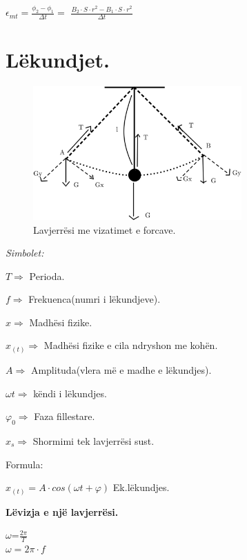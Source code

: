 \documentclass[twocolumn]{article}
\begin{document}
	$\epsilon_{mt} = \frac{\phi_2 - \phi_1}{\Delta t}$$=$ $\frac{B_2 \cdot S \cdot r^2-B_1 \cdot S \cdot r^2}{\Delta t}$
	
	\section{Lëkundjet.}
	
	\begin{figure}[h]
		\includegraphics[width=80mm]{Imazhet/lekundjet.png}
		\caption{Lavjerrësi me vizatimet e forcave.}
		\label{fig:boat1}
	\end{figure}
	\begin{center}
		\textit{Simbolet:}
	\end{center}
	
	$T \Rightarrow$ Perioda.
	
	$f \Rightarrow $ Frekuenca(numri i lëkundjeve).
	
	$x \Rightarrow$ Madhësi fizike.
	
	$x_{(t)} \Rightarrow$ Madhësi fizike e cila ndryshon me kohën.
	
	$A \Rightarrow$ Amplituda(vlera më e madhe e lëkundjes).
	
	$\omega t \Rightarrow$ këndi i lëkundjes.
	
	$\varphi_0 \Rightarrow$ Faza fillestare.
	
	$x_s \Rightarrow $ Shormimi tek lavjerrësi sust.
	\begin{center}
		Formula:
	\end{center}
	
	$x_{(t)}=A \cdot cos(\omega t + \varphi) $ Ek.lëkundjes.
	
	\begin{center}
		\textbf{Lëvizja e një lavjerrësi.}
		
		$\omega$=$\frac{2 \pi}{T}$\\
		
		$\omega=2\pi \cdot f$\\
		
	\end{center}
	
\end{document}
